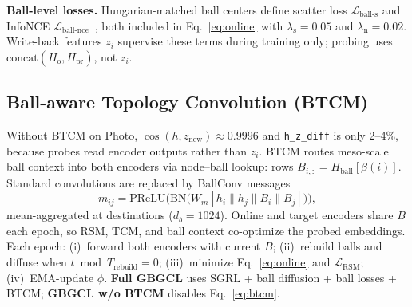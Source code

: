 \documentclass[conference]{IEEEtran}
\begin{document}
\textbf{Ball-level losses.}
Hungarian-matched ball centers define scatter loss $\mathcal{L}_{\mathrm{ball\mbox{-}s}}$ and InfoNCE $\mathcal{L}_{\mathrm{ball\mbox{-}nce}}$~\cite{he2024sgrl,sun2024sgcl}, both included in Eq.~\eqref{eq:online} with $\lambda_{\mathrm{s}}{=}0.05$ and $\lambda_{\mathrm{n}}{=}0.02$.
Write-back features $z_i$ supervise these terms during training only; probing uses $\mathrm{concat}(H_{\mathrm{o}},H_{\mathrm{pr}})$, not $z_i$.

\subsection{Ball-aware Topology Convolution (BTCM)}
\label{sec:btcm}

Without BTCM on Photo, $\cos(h,z_{\mathrm{new}})\approx 0.9996$ and \texttt{h\_z\_diff} is only 2--4\%, because probes read encoder outputs rather than $z_i$.
BTCM routes meso-scale ball context into both encoders via node--ball lookup: rows $B_{i,:}=H_{\mathrm{ball}}[\beta(i)]$.
Standard convolutions are replaced by BallConv messages
\begin{equation}
  m_{ij} = \mathrm{PReLU}\!\Big(\mathrm{BN}\big(W_m [h_i \| h_j \| B_i \| B_j]\big)\Big),
  \label{eq:btcm}
\end{equation}
mean-aggregated at destinations ($d_b{=}1024$).
Online and target encoders share $B$ each epoch, so RSM, TCM, and ball context co-optimize the probed embeddings.
Each epoch: (i)~forward both encoders with current $B$; (ii)~rebuild balls and diffuse when $t \bmod T_{\mathrm{rebuild}}=0$; (iii)~minimize Eq.~\eqref{eq:online} and $\mathcal{L}_{\mathrm{RSM}}$; (iv)~EMA-update $\phi$.
\textbf{Full GBGCL} uses SGRL + ball diffusion + ball losses + BTCM; \textbf{GBGCL w/o BTCM} disables Eq.~\eqref{eq:btcm}.
\end{document}
